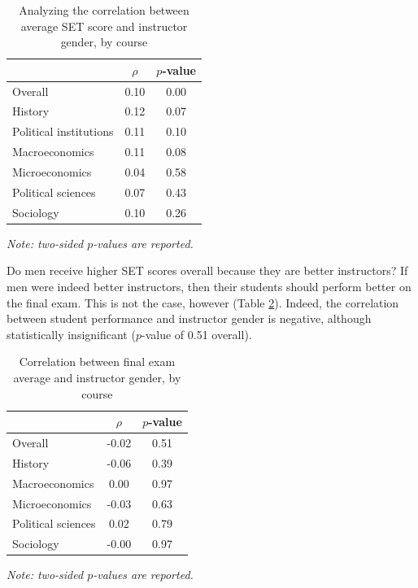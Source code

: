 \documentclass[12pt]{article}
\begin{document}
\begin{table}[htbp]
  \centering
  \footnotesize 
  \caption{Analyzing the correlation between average SET score and instructor gender, by course}
    \begin{tabular}{lcc}
    \toprule 
                          & $\rho$  & $p$-value     \\
   \midrule
    Overall &                 0.10       & 0.00     \\
    History &                 0.12       & 0.07     \\
    Political institutions &  0.11       & 0.10     \\
    Macroeconomics &          0.11       & 0.08     \\
    Microeconomics &          0.04       & 0.58     \\
    Political sciences &      0.07       & 0.43     \\
    Sociology &               0.10       & 0.26     \\
    \bottomrule
    \end{tabular}%
 \label{tab:instructorgender}%
  
  \textit{Note: two-sided $p$-values are reported.}
\end{table}%
\normalsize


Do men receive higher SET scores overall because they are better instructors? If men were indeed better instructors, then their students should perform better on the final exam. This is not the case, however (Table \ref{tab:genderfinal}). Indeed, the correlation between student performance and instructor gender is negative, although statistically insignificant ($p$-value of 0.51 overall). 



\begin{table}[htbp]
  \centering
  \footnotesize 
  \caption{Correlation between final exam average and instructor gender, by course}
    \begin{tabular}{lcc}
    \toprule 
                     & $\rho$  & $p$-value    \\
   \midrule
    Overall &            -0.02       & 0.51      \\
    History &            -0.06       & 0.39      \\
    Macroeconomics &      0.00       & 0.97      \\
    Microeconomics &     -0.03       & 0.63      \\
    Political sciences &  0.02       & 0.79      \\
    Sociology &          -0.00       & 0.97      \\
    \bottomrule
    \end{tabular}%
 \label{tab:genderfinal}%
 
  \textit{Note: two-sided $p$-values are reported.}
\end{table}%
\normalsize
\end{document}
